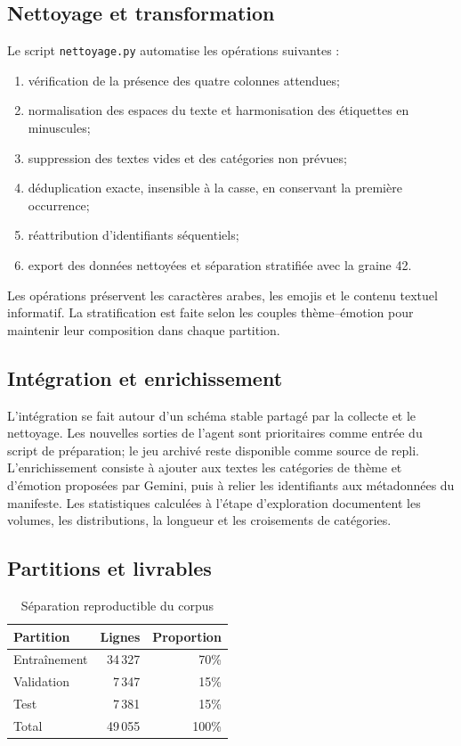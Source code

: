 \documentclass[11pt,a4paper]{article}
\begin{document}
\subsection{Nettoyage et transformation}
Le script \texttt{nettoyage.py} automatise les opérations suivantes :
\begin{enumerate}[leftmargin=1.5em,itemsep=2pt]
  \item vérification de la présence des quatre colonnes attendues;
  \item normalisation des espaces du texte et harmonisation des étiquettes en minuscules;
  \item suppression des textes vides et des catégories non prévues;
  \item déduplication exacte, insensible à la casse, en conservant la première occurrence;
  \item réattribution d'identifiants séquentiels;
  \item export des données nettoyées et séparation stratifiée avec la graine 42.
\end{enumerate}
Les opérations préservent les caractères arabes, les emojis et le contenu textuel informatif. La stratification est faite selon les couples thème--émotion pour maintenir leur composition dans chaque partition.

\subsection{Intégration et enrichissement}
L'intégration se fait autour d'un schéma stable partagé par la collecte et le nettoyage. Les nouvelles sorties de l'agent sont prioritaires comme entrée du script de préparation; le jeu archivé reste disponible comme source de repli. L'enrichissement consiste à ajouter aux textes les catégories de thème et d'émotion proposées par Gemini, puis à relier les identifiants aux métadonnées du manifeste. Les statistiques calculées à l'étape d'exploration documentent les volumes, les distributions, la longueur et les croisements de catégories.

\subsection{Partitions et livrables}
\begin{table}[H]
\centering
\caption{Séparation reproductible du corpus}
\begin{tabular}{lrr}
\toprule Partition & Lignes & Proportion \\
\midrule Entraînement & 34\,327 & 70\% \\
Validation & 7\,347 & 15\% \\
Test & 7\,381 & 15\% \\
\midrule Total & 49\,055 & 100\% \\
\bottomrule
\end{tabular}
\end{table}
\end{document}
